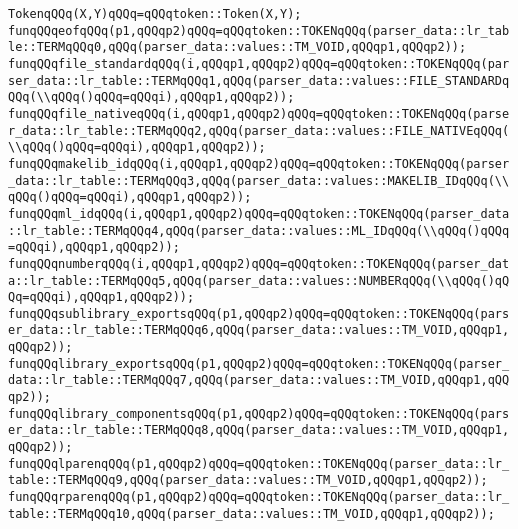 \verb|TokenqQQq(X,Y)qQQq=qQQqtoken::Token(X,Y);|\newline
\verb|funqQQqeofqQQq(p1,qQQqp2)qQQq=qQQqtoken::TOKENqQQq(parser_data::lr_table::TERMqQQq0,qQQq(parser_data::values::TM_VOID,qQQqp1,qQQqp2));|\newline
\verb|funqQQqfile_standardqQQq(i,qQQqp1,qQQqp2)qQQq=qQQqtoken::TOKENqQQq(parser_data::lr_table::TERMqQQq1,qQQq(parser_data::values::FILE_STANDARDqQQq(\\qQQq()qQQq=qQQqi),qQQqp1,qQQqp2));|\newline
\verb|funqQQqfile_nativeqQQq(i,qQQqp1,qQQqp2)qQQq=qQQqtoken::TOKENqQQq(parser_data::lr_table::TERMqQQq2,qQQq(parser_data::values::FILE_NATIVEqQQq(\\qQQq()qQQq=qQQqi),qQQqp1,qQQqp2));|\newline
\verb|funqQQqmakelib_idqQQq(i,qQQqp1,qQQqp2)qQQq=qQQqtoken::TOKENqQQq(parser_data::lr_table::TERMqQQq3,qQQq(parser_data::values::MAKELIB_IDqQQq(\\qQQq()qQQq=qQQqi),qQQqp1,qQQqp2));|\newline
\verb|funqQQqml_idqQQq(i,qQQqp1,qQQqp2)qQQq=qQQqtoken::TOKENqQQq(parser_data::lr_table::TERMqQQq4,qQQq(parser_data::values::ML_IDqQQq(\\qQQq()qQQq=qQQqi),qQQqp1,qQQqp2));|\newline
\verb|funqQQqnumberqQQq(i,qQQqp1,qQQqp2)qQQq=qQQqtoken::TOKENqQQq(parser_data::lr_table::TERMqQQq5,qQQq(parser_data::values::NUMBERqQQq(\\qQQq()qQQq=qQQqi),qQQqp1,qQQqp2));|\newline
\verb|funqQQqsublibrary_exportsqQQq(p1,qQQqp2)qQQq=qQQqtoken::TOKENqQQq(parser_data::lr_table::TERMqQQq6,qQQq(parser_data::values::TM_VOID,qQQqp1,qQQqp2));|\newline
\verb|funqQQqlibrary_exportsqQQq(p1,qQQqp2)qQQq=qQQqtoken::TOKENqQQq(parser_data::lr_table::TERMqQQq7,qQQq(parser_data::values::TM_VOID,qQQqp1,qQQqp2));|\newline
\verb|funqQQqlibrary_componentsqQQq(p1,qQQqp2)qQQq=qQQqtoken::TOKENqQQq(parser_data::lr_table::TERMqQQq8,qQQq(parser_data::values::TM_VOID,qQQqp1,qQQqp2));|\newline
\verb|funqQQqlparenqQQq(p1,qQQqp2)qQQq=qQQqtoken::TOKENqQQq(parser_data::lr_table::TERMqQQq9,qQQq(parser_data::values::TM_VOID,qQQqp1,qQQqp2));|\newline
\verb|funqQQqrparenqQQq(p1,qQQqp2)qQQq=qQQqtoken::TOKENqQQq(parser_data::lr_table::TERMqQQq10,qQQq(parser_data::values::TM_VOID,qQQqp1,qQQqp2));|\newline
